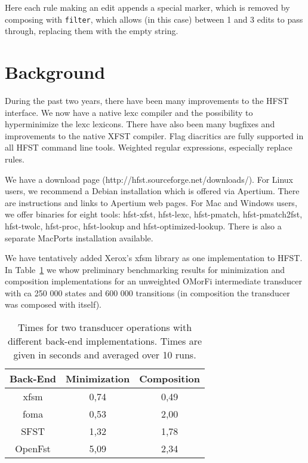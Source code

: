 \documentclass{llncs}
\begin{document}
Here each rule making an edit appends a special marker, which is removed
by composing with \verb+filter+, which allows (in this case) between 1 and 3
edits to pass through, replacing them with the empty string.

\section{Background}\label{sec:background}
During the past two years, there have been many improvements to the HFST 
interface. We now have a native lexc compiler and the possibility to 
hyperminimize the lexc lexicons. There have also been many bugfixes and 
improvements to the native XFST compiler. Flag diacritics are fully supported 
in all HFST command line tools. Weighted regular expressions, especially replace rules.

We have a download page (http://hfst.sourceforge.net/downloads/). For Linux 
users, we recommend a Debian installation which is offered via Apertium. There
are instructions and links to Apertium web pages. For Mac and Windows users,
we offer binaries for eight tools: hfst-xfst, hfst-lexc, hfst-pmatch,
hfst-pmatch2fst, hfst-twolc, hfst-proc, hfst-lookup and hfst-optimized-lookup.
There is also a separate MacPorts installation available.

We have tentatively added Xerox's xfsm library as one implementation to HFST.
In Table~\ref{operationtimes} we whow preliminary benchmarking results for
minimization and composition implementations for an unweighted OMorFi intermediate
transducer with ca 250 000 states and 600 000 transitions (in composition the transducer was composed
with itself).

\begin{table}[h!]
  \centering
  \caption{Times for two transducer operations with different back-end implementations.
    Times are given in seconds and averaged over 10 runs.}
  \begin{tabular}{c c c }
    \hline
    Back-End & Minimization & Composition \\ \hline
    xfsm & 0,74 & 0,49 \\
    foma & 0,53 & 2,00 \\
    SFST & 1,32 & 1,78 \\
    OpenFst & 5,09 & 2,34 \\ \hline
  \end{tabular}
  \label{operationtimes}
\end{table}
\end{document}
